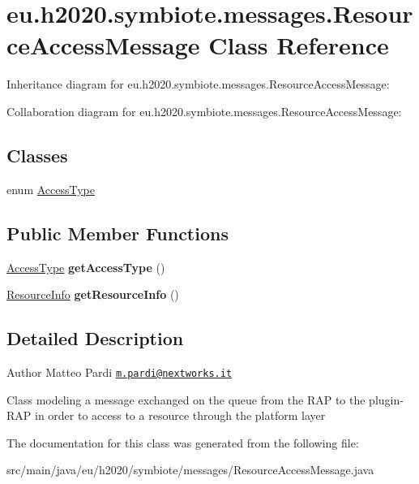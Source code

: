 \hypertarget{classeu_1_1h2020_1_1symbiote_1_1messages_1_1ResourceAccessMessage}{}\section{eu.\+h2020.\+symbiote.\+messages.\+Resource\+Access\+Message Class Reference}
\label{classeu_1_1h2020_1_1symbiote_1_1messages_1_1ResourceAccessMessage}


Inheritance diagram for eu.\+h2020.\+symbiote.\+messages.\+Resource\+Access\+Message\+:


Collaboration diagram for eu.\+h2020.\+symbiote.\+messages.\+Resource\+Access\+Message\+:
\subsection*{Classes}
\begin{DoxyCompactItemize}
\item 
enum \hyperlink{enumeu_1_1h2020_1_1symbiote_1_1messages_1_1ResourceAccessMessage_1_1AccessType}{Access\+Type}
\end{DoxyCompactItemize}
\subsection*{Public Member Functions}
\begin{DoxyCompactItemize}
\item 
\mbox{\label{classeu_1_1h2020_1_1symbiote_1_1messages_1_1ResourceAccessMessage_a35087082491bac54b5eb858ec00b263e}} 
\hyperlink{enumeu_1_1h2020_1_1symbiote_1_1messages_1_1ResourceAccessMessage_1_1AccessType}{Access\+Type} {\bfseries get\+Access\+Type} ()
\item 
\mbox{\label{classeu_1_1h2020_1_1symbiote_1_1messages_1_1ResourceAccessMessage_a291f2face0edebba2c5bb23ee8ce46c4}} 
\hyperlink{classeu_1_1h2020_1_1symbiote_1_1resources_1_1ResourceInfo}{Resource\+Info} {\bfseries get\+Resource\+Info} ()
\end{DoxyCompactItemize}


\subsection{Detailed Description}
\begin{DoxyAuthor}{Author}
Matteo Pardi \href{mailto:m.pardi@nextworks.it}{\tt m.\+pardi@nextworks.\+it}
\end{DoxyAuthor}
Class modeling a message exchanged on the queue from the R\+AP to the plugin-\/\+R\+AP in order to access to a resource through the platform layer 

The documentation for this class was generated from the following file\+:\begin{DoxyCompactItemize}
\item 
src/main/java/eu/h2020/symbiote/messages/Resource\+Access\+Message.\+java\end{DoxyCompactItemize}
